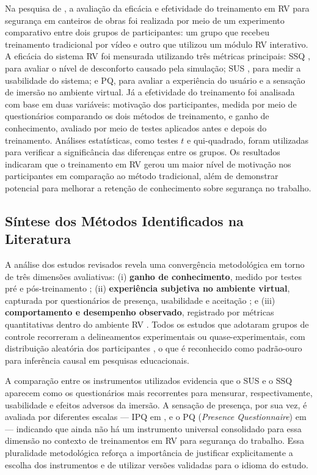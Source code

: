 Na pesquisa de , a avaliação da eficácia e efetividade do treinamento em RV para segurança em canteiros de obras foi realizada por meio de um experimento comparativo entre dois grupos de participantes: um grupo que recebeu treinamento tradicional por vídeo e outro que utilizou um módulo RV interativo. A eficácia do sistema RV foi mensurada utilizando três métricas principais: \gls{SSQ} \cite{kennedy1993}, para avaliar o nível de desconforto causado pela simulação; SUS \cite{brooke1996}, para medir a usabilidade do sistema; e \gls{PQ}, para avaliar a experiência do usuário e a sensação de imersão no ambiente virtual. Já a efetividade do treinamento foi analisada com base em duas variáveis: motivação dos participantes, medida por meio de questionários comparando os dois métodos de treinamento, e ganho de conhecimento, avaliado por meio de testes aplicados antes e depois do treinamento. Análises estatísticas, como testes $t$ e qui-quadrado, foram utilizadas para verificar a significância das diferenças entre os grupos. Os resultados indicaram que o treinamento em RV gerou um maior nível de motivação nos participantes em comparação ao método tradicional, além de demonstrar potencial para melhorar a retenção de conhecimento sobre segurança no trabalho.

\subsection{Síntese dos Métodos Identificados na Literatura}

A análise dos estudos revisados revela uma convergência metodológica em torno de três dimensões avaliativas: (i) \textbf{ganho de conhecimento}, medido por testes pré e pós-treinamento \cite{abotaleb2023,joshi2021}; (ii) \textbf{experiência subjetiva no ambiente virtual}, capturada por questionários de presença, usabilidade e aceitação \cite{nykanen2020,xu2021,joshi2021}; e (iii) \textbf{comportamento e desempenho observado}, registrado por métricas quantitativas dentro do ambiente RV \cite{xu2021}. Todos os estudos que adotaram grupos de controle recorreram a delineamentos experimentais ou quase-experimentais, com distribuição aleatória dos participantes \cite{abotaleb2023,nykanen2020,joshi2021}, o que é reconhecido como padrão-ouro para inferência causal em pesquisas educacionais.

A comparação entre os instrumentos utilizados evidencia que o \gls{SUS} e o \gls{SSQ} aparecem como os questionários mais recorrentes para mensurar, respectivamente, usabilidade e efeitos adversos da imersão. A sensação de presença, por sua vez, é avaliada por diferentes escalas — \gls{IPQ} \cite{schubert2001} em , e o PQ (\textit{Presence Questionnaire}) em  — indicando que ainda não há um instrumento universal consolidado para essa dimensão no contexto de treinamentos em RV para segurança do trabalho. Essa pluralidade metodológica reforça a importância de justificar explicitamente a escolha dos instrumentos e de utilizar versões validadas para o idioma do estudo.

